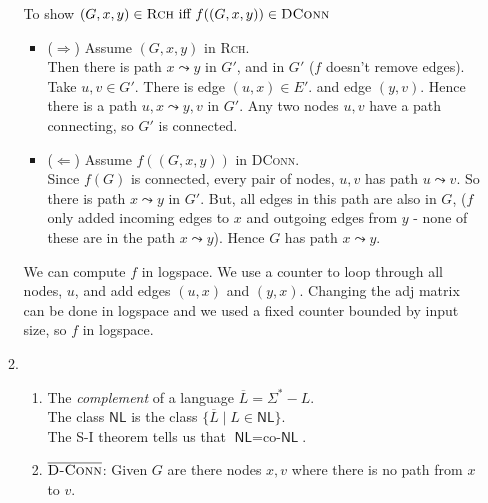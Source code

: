 \documentclass[a4paper, draft, 12pt]{article}
\begin{document}
\begin{enumerate}
\begin{enumerate}
  To show $(G,x,y) \in \textsc{Rch} \text{ iff } f((G,x,y)) \in \textsc{DConn}$
  \begin{itemize}
  \item ($\Rightarrow$) Assume $(G,x,y)$ in \textsc{Rch}. \\
  Then there is path $x \leadsto y$ in $G'$, and in $G'$ ($f$ doesn't remove edges). \\
  Take $u, v \in G'$. There is edge $(u, x) \in E'$. and edge $(y,v)$. 
  Hence there is a path $u,x \leadsto y,v$ in $G'$. Any two nodes $u, v$ have a path connecting,
  so $G'$ is connected.
  \item ($\Leftarrow$) Assume $f((G,x,y))$ in \textsc{DConn}. \\
  Since $f(G)$ is connected, every pair of nodes, $u,v$ has path $u \leadsto v$. 
  So there is path $x \leadsto y$ in $G'$. But, all edges in this path 
  are also in $G$, ($f$ only added incoming edges to $x$ and outgoing edges from $y$ - 
  none of these are in the path $x \leadsto y$). Hence $G$ has path $x \leadsto y$.
  \end{itemize}
  We can compute $f$ in logspace. We use a counter to loop through all nodes, $u$, 
  and add edges $(u,x)$ and $(y,x)$. Changing the adj matrix can be done in logspace and 
  we used a fixed counter bounded by input size, so $f$ in logspace.
  \item %
  \begin{enumerate}
  \item %
  The \textit{complement} of a language $\overline{L} = \Sigma^{*} - L$. \\
  The class $\textsf{NL}$ is the class $\{ \overline{L} \;|\; L \in \textsf{NL} \}$. \\
  The S-I theorem tells us that $\textsf{NL} = \text{co-}\textsf{NL}$. 
  \item %
  $\overline{\textsc{D-Conn}}$: Given $G$ are there nodes $x,v$ where 
  there is no path from $x$ to $v$. 


\end{enumerate}
\end{enumerate}
\end{enumerate}
\end{document}
